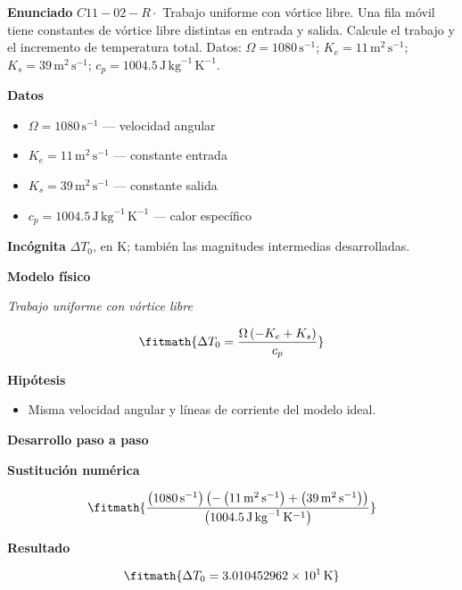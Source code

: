 \documentclass[10pt,openany]{book}
\begin{document}
\begin{tcolorbox}[title={Problema resuelto 2}, studiumworked, breakable]

\noindent\textbf{Enunciado}
\(C11-02-R \cdot\) Trabajo uniforme con vórtice libre. Una fila móvil tiene constantes de vórtice libre distintas en entrada y salida. Calcule el trabajo y el incremento de temperatura total. Datos: \(\Omega=1080\, \mathrm{s}^{-1}\); \(K_e=11\, \mathrm{m}^{2}\,\mathrm{s}^{-1}\); \(K_s=39\, \mathrm{m}^{2}\,\mathrm{s}^{-1}\); \(c_p=1004.5\, \mathrm{J}\,\mathrm{kg}^{-1}\,\mathrm{K}^{-1}\).

\noindent\textbf{Datos}
\begin{itemize}
\item $\Omega = 1080\,\mathrm{s}^{-1}$ — velocidad angular
\item $K_e = 11\,\mathrm{m}^{2}\,\mathrm{s}^{-1}$ — constante entrada
\item $K_s = 39\,\mathrm{m}^{2}\,\mathrm{s}^{-1}$ — constante salida
\item $c_p = 1004.5\,\mathrm{J}\,\mathrm{kg}^{-1}\,\mathrm{K}^{-1}$ — calor específico
\end{itemize}

\noindent\textbf{Incógnita}
$\Delta T_0$, en $\mathrm{K}$; también las magnitudes intermedias desarrolladas.

\noindent\textbf{Modelo físico}

\noindent\textit{Trabajo uniforme con vórtice libre}

\[
\fitmath{\Delta T_0=\frac{\Omega \left(- K_e + K_s\right)}{c_p}}
\]

\noindent\textbf{Hipótesis}
\begin{itemize}
\item Misma velocidad angular y líneas de corriente del modelo ideal.
\end{itemize}

\noindent\textbf{Desarrollo paso a paso}



\noindent\textbf{Sustitución numérica}

\[
\fitmath{\frac{\left(1080\,\mathrm{s}^{-1}\right) \left(- \left(11\,\mathrm{m}^{2}\,\mathrm{s}^{-1}\right) + \left(39\,\mathrm{m}^{2}\,\mathrm{s}^{-1}\right)\right)}{\left(1004.5\,\mathrm{J}\,\mathrm{kg}^{-1}\,\mathrm{K}^{-1}\right)}}
\]

\noindent\textbf{Resultado}

\[
\fitmath{\Delta T_0=3.010452962\times10^{1}\,\mathrm{K}}
\]


\end{tcolorbox}
\end{document}
